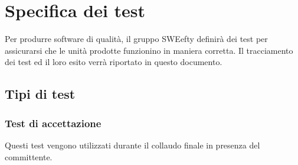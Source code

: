 \section{Specifica dei test}
\label{specifica}
Per produrre software di qualità, il gruppo SWEefty definirà dei test per assicurarsi che le unità prodotte funzionino in maniera corretta. Il tracciamento dei test ed il loro esito verrà riportato in questo documento.
	\subsection{Tipi di test}
	
		\subsubsection{Test di accettazione}
	Questi test vengono utilizzati durante il collaudo finale in presenza del committente.
	
